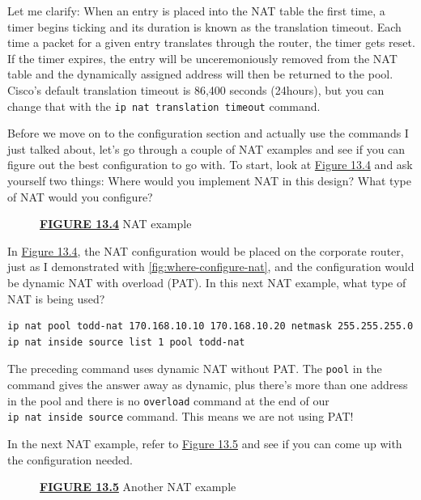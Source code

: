 \documentclass[b5paper,11pt]{memoir}
\begin{document}
Let me clarify: When an entry is placed into the NAT table the first
time, a timer begins ticking and its duration is known as the
translation timeout. Each time a packet for a given entry translates
through the router, the timer gets reset. If the timer expires, the
entry will be unceremoniously removed from the NAT table and the
dynamically assigned address will then be returned to the pool. Cisco's
default translation timeout is 86,400 seconds (24hours), but you can
change that with the \texttt{ip\ nat\ translation\ timeout} command.

Before we move on to the configuration section and actually use the
commands I just talked about, let's go through a couple of NAT examples
and see if you can figure out the best configuration to go with. To
start, look at \protect\hyperlink{c13.xhtmlux5cux23figure13-4}{Figure
13.4} and ask yourself two things: Where would you implement NAT in this
design? What type of NAT would you configure?



\begin{figure}
\centering

\caption{{\protect\hyperlink{c13.xhtmlux5cux23figureanchor13-4}{\textbf{FIGURE
13.4}} NAT example}}
\end{figure}

In \protect\hyperlink{c13.xhtmlux5cux23figure13-4}{Figure 13.4}, the NAT
configuration would be placed on the corporate router, just as I
demonstrated with \cref{fig:where-configure-nat}, and the configuration would be dynamic NAT with overload (PAT).
In this next NAT example, what type of NAT is being used?

\begin{verbatim}
ip nat pool todd-nat 170.168.10.10 170.168.10.20 netmask 255.255.255.0
ip nat inside source list 1 pool todd-nat
\end{verbatim}

The preceding command uses dynamic NAT without PAT. The \texttt{pool} in
the command gives the answer away as dynamic, plus there's more than one
address in the pool and there is no \texttt{overload} command at the end
of our \texttt{ip\ nat\ inside\ source} command. This means we are not
using PAT!

In the next NAT example, refer to
\protect\hyperlink{c13.xhtmlux5cux23figure13-5}{Figure 13.5} and see if
you can come up with the configuration needed.

\begin{figure}
\centering

\caption{{\protect\hyperlink{c13.xhtmlux5cux23figureanchor13-5}{\textbf{FIGURE
13.5}} Another NAT example}}
\end{figure}
\end{document}
